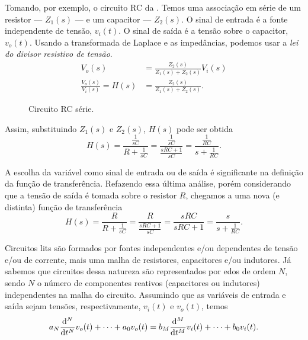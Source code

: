 Tomando, por exemplo, o circuito RC da . Temos uma associação em série de um resistor --- $Z_1(s)$ --- e um capacitor --- $Z_2(s)$. O sinal de entrada é a fonte independente de tensão, $v_i(t)$. O sinal de saída é a tensão sobre o capacitor, $v_o(t)$. Usando a transformada de Laplace e as impedâncias, podemos usar a \emph{lei do divisor resistivo de tensão}.
\begin{align*}
	V_o(s)&=\frac{Z_2(s)}{Z_1(s)+Z_2(s)}V_i(s)\\
	\frac{V_o(s)}{V_i(s)}=H(s)&=\frac{Z_2(s)}{Z_1(s)+Z_2(s)}.
\end{align*}

\begin{figure}
	\centering
	\caption{Circuito RC série.}
	\label{fig:RC}
\end{figure}

Assim, substituindo $Z_1(s)$ e $Z_2(s)$, $H(s)$ pode ser obtida
\begin{equation}\label{eq:RC}
	H(s)=\frac{\displaystyle\frac{1}{sC}}{\displaystyle R+\frac{1}{sC}}=\frac{\displaystyle\frac{1}{sC}}{\displaystyle\frac{sRC+1}{sC}}=\frac{\displaystyle\frac{1}{RC}}{\displaystyle s+\frac{1}{RC}}.
\end{equation}

A escolha da variável como sinal de entrada ou de saída é significante na definição da função de transferência. Refazendo essa última análise, porém considerando que a tensão de saída é tomada sobre o resistor $R$, chegamos a uma nova (e distinta) função de transferência
\begin{equation*}
	H(s)=\frac{R}{\displaystyle R+\frac{1}{sC}}=\frac{R}{\displaystyle\frac{sRC+1}{sC}}=\frac{sRC}{sRC+1}=\frac{s}{\displaystyle s+\frac{1}{RC}}.
\end{equation*}

Circuitos \acp{lit} são formados por fontes independentes e\slash ou dependentes de tensão e\slash ou de corrente, mais uma malha de resistores, capacitores e\slash ou indutores. Já sabemos que circuitos dessa natureza são representados por \acp{edo} de ordem $N$, sendo $N$ o número de componentes reativos (capacitores ou indutores) independentes na malha do circuito. Assumindo que as variáveis de entrada e saída sejam tensões, respectivamente, $v_i(t)$ e $v_o(t)$, temos
\begin{equation}\label{eq:edo}
	a_N\diffn{v_o(t)}{t}{N}+\cdots+a_0v_o(t)=b_M\diffn{v_i(t)}{t}{M}+\cdots+b_0v_i(t).
\end{equation}

